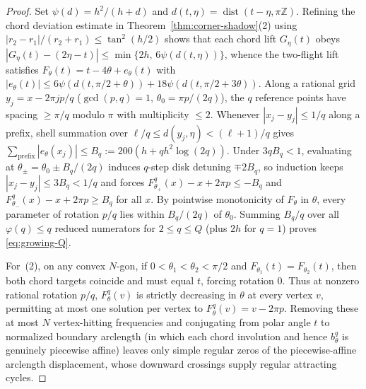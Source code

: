 \documentclass[11pt,reqno]{amsart}
\theoremstyle{definition}
\theoremstyle{remark}
\newcommand{\Z}{\mathbb{Z}}
\DeclareMathOperator{\dist}{dist}
\begin{document}
\begin{proof}
Set $\psi(d) = h^2/(h + d)$ and $d(t,\eta) = \dist(t - \eta, \pi\Z)$. Refining the chord deviation estimate in Theorem~\ref{thm:corner-shadow}(2) using $|r_2 - r_1|/(r_2+r_1) \le \tan^2(h/2)$ shows that each chord lift $G_\eta(t)$ obeys $|G_\eta(t) - (2\eta - t)| \le \min\{2h,\, 6\psi(d(t,\eta))\}$, whence the two-flight lift satisfies $F_\theta(t) = t - 4\theta + e_\theta(t)$ with $|e_\theta(t)| \le 6\psi(d(t, \pi/2 + \theta)) + 18\psi(d(t, \pi/2 + 3\theta))$. Along a rational grid $y_j = x - 2\pi jp/q$ ($\gcd(p,q)=1$, $\theta_0 = \pi p/(2q)$), the $q$ reference points have spacing $\ge \pi/q$ modulo $\pi$ with multiplicity $\le 2$. Whenever $|x_j - y_j| \le 1/q$ along a prefix, shell summation over $\ell/q \le d(y_j,\eta) < (\ell+1)/q$ gives $\sum_{\text{prefix}} |e_\theta(x_j)| \le B_q := 200(h + q h^2 \log(2q))$. Under $3q B_q < 1$, evaluating at $\theta_\pm = \theta_0 \pm B_q/(2q)$ induces $q$-step disk detuning $\mp 2B_q$, so induction keeps $|x_j - y_j| \le 3B_q < 1/q$ and forces $F_{\theta_+}^q(x) - x + 2\pi p \le -B_q$ and $F_{\theta_-}^q(x) - x + 2\pi p \ge B_q$ for all $x$. By pointwise monotonicity of $F_\theta$ in $\theta$, every parameter of rotation $p/q$ lies within $B_q/(2q)$ of $\theta_0$. Summing $B_q/q$ over all $\varphi(q) \le q$ reduced numerators for $2 \le q \le Q$ (plus $2h$ for $q = 1$) proves \eqref{eq:growing-Q}.

For~(2), on any convex $N$-gon, if $0 < \theta_1 < \theta_2 < \pi/2$ and $F_{\theta_1}(t) = F_{\theta_2}(t)$, then both chord targets coincide and must equal $t$, forcing rotation $0$. Thus at nonzero rational rotation $p/q$, $F_\theta^q(v)$ is strictly decreasing in $\theta$ at every vertex $v$, permitting at most one solution per vertex to $F_\theta^q(v) = v - 2\pi p$. Removing these at most $N$ vertex-hitting frequencies and conjugating from polar angle $t$ to normalized boundary arclength (in which each chord involution and hence $b_\theta^q$ is genuinely piecewise affine) leaves only simple regular zeros of the piecewise-affine arclength displacement, whose downward crossings supply regular attracting cycles.
\end{proof}
\end{document}
